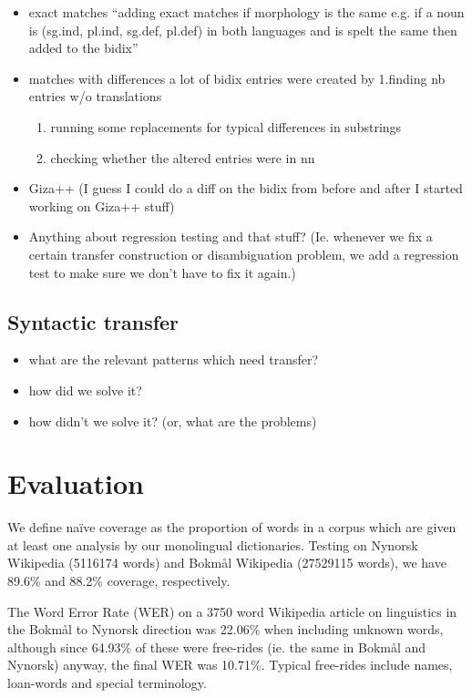 \documentclass[11pt]{article}
\begin{document}
\begin{itemize}
\item exact matches ``adding exact matches if morphology is the same
  e.g. if a noun is (sg.ind, pl.ind, sg.def, pl.def) in both
  languages and is spelt the same then added to the bidix''
\item matches with differences a lot of bidix entries were created by
  1.finding nb entries w/o translations

\begin{enumerate}
\item running some replacements for typical differences in substrings
\item checking whether the altered entries were in nn
\end{enumerate}

\item Giza++ (I guess I could do a diff on the bidix from before and after
  I started working on Giza++ stuff)
\item Anything about regression testing and that stuff? (Ie. whenever we
  fix a certain transfer construction or disambiguation problem, we
  add a regression test to make sure we don't have to fix it again.)
\end{itemize}
\subsection{Syntactic transfer}
\label{sec-3.5}

\begin{itemize}
\item what are the relevant patterns which need transfer?
\item how did we solve it?
\item how didn't we solve it? (or, what are the problems)
\end{itemize}
\section{Evaluation}
\label{sec-4}

We define naïve coverage as the proportion of words in a corpus which
are given at least one analysis by our monolingual
dictionaries. Testing on Nynorsk Wikipedia (5116174 words) and Bokmål
Wikipedia (27529115 words), we have 89.6\% and 88.2\% coverage,
respectively.

The Word Error Rate (WER) on a 3750 word Wikipedia article on
linguistics in the Bokmål to Nynorsk direction was 22.06\% when
including unknown words, although since 64.93\% of these were
free-rides (ie. the same in Bokmål and Nynorsk) anyway, the final WER
was 10.71\%. Typical free-rides include names, loan-words and special
terminology.
\end{document}
